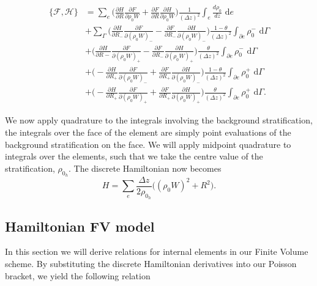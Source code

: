 \documentclass[a4paper,11pt]{article}
\begin{document}
 \begin{equation}
\begin{aligned}
 \{ \mathcal{F},  \mathcal{H}\} &= \sum_e \bigg( \frac{\partial H }{\partial R } \frac{\partial F}{\partial\rho_0 W} + \frac{\partial F }{ \partial R} \frac{\partial H}{ \partial \rho_0 W} \bigg)\frac{1}{(\Delta z)^2} \int_e \frac{d\rho_0}{dz} \text{ d} e \\
 &+ \sum_\Gamma \bigg ( \frac{\partial H}{\partial R_-}\frac{\partial F}{\partial (\rho_0 W)_-} - \frac{\partial F}{\partial R_-}\frac{\partial H}{\partial (\rho_0 W)_-}\bigg  ) \frac{1-\theta}{(\Delta z)^2}\int_{\partial e} \rho_0^- \text{ d} \Gamma\\ &+  \bigg  ( \frac{\partial H}{\partial R-}\frac{\partial F}{\partial (\rho_0 W)_+} - \frac{\partial F}{\partial R_-}\frac{\partial H}{\partial (\rho_0 W)_+}\bigg  ) \frac{\theta}{(\Delta z)^2} \int_{\partial e} \rho_0^- \text{ d} \Gamma\\
 & + \bigg  ( - \frac{\partial H}{\partial R_+}\frac{\partial F}{\partial (\rho_0 W)_-} + \frac{\partial F}{\partial R_+}\frac{\partial H}{\partial (\rho_0 W)_-}\bigg  ) \frac{1-\theta}{(\Delta z)^2}\int_{\partial e} \rho_0^+ \text{ d} \Gamma\\  &+ \bigg  ( - \frac{\partial H}{\partial R_+}\frac{\partial F}{\partial (\rho_0 W)_+} + \frac{\partial F}{\partial R_+}\frac{\partial H}{\partial (\rho_0 W)_+}\bigg  ) \frac{\theta}{(\Delta z)^2}\int_{\partial e} \rho_0^+ \text{ d} \Gamma .
 \end{aligned}
 \end{equation}

We now apply quadrature to the integrals involving the background stratification, the integrals over the face of the element are simply point evaluations of the background stratification on the face. We will apply midpoint quadrature to integrals over the elements, such that we take the centre value of the stratification, $\rho_{0{{}_h}}$.
The discrete Hamiltonian now becomes 
\[ H = \sum_e \frac{\Delta z}{2 \rho_{0{{}_h}}}\bigg ( (\rho_0 W)^2 + R^2 \bigg).\]

\subsection{Hamiltonian FV model}
 In this section we will derive relations for internal elements in our Finite Volume scheme. By substituting the discrete Hamiltonian derivatives into our Poisson bracket, we yield the following relation
 
\end{document}
